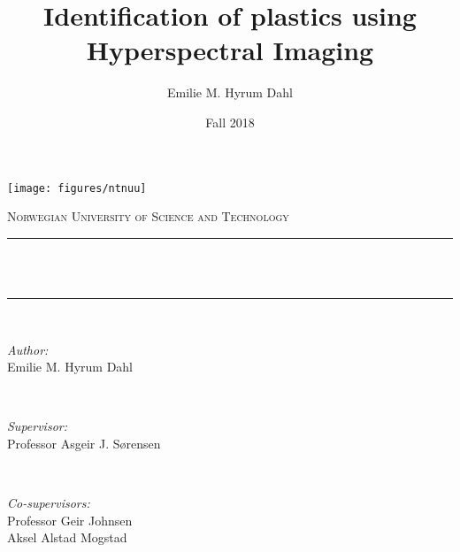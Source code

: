 \documentclass{report}
\title{Identification of plastics using Hyperspectral Imaging}								%
\author{Emilie M. Hyrum Dahl}								%
\date{Fall 2018}											%
\makeatletter
\let\thetitle\@title
\makeatother
\begin{document}
\begin{titlepage}
	\centering
    \vspace*{0.5 cm}
    \texttt{[image: figures/ntnuu]}\\[1.0 cm]	%
    \begin{centering}
    \textsc{\LARGE Norwegian University of \newline\newline Science and Technology}\\[1.0 cm]	%
    \end{centering}
	\rule{\linewidth}{0.3 mm} \\[0.4 cm]
	{ \huge \bfseries \thetitle}\\
	\rule{\linewidth}{0.3 mm} \\[1.3 cm]
	
	\begin{minipage}{0.4\textwidth}
		\begin{flushleft} \large
			\emph{Author:} \\
	    	Emilie M. Hyrum Dahl
			\end{flushleft}
			\end{minipage}~
			\begin{minipage}{0.4\textwidth}
            
			\begin{flushright} \large
	        \emph{Supervisor:}\\
			Professor Asgeir J. S{\o}rensen\\
		\end{flushright}
		\end{minipage}\\[0.5 cm]
		
		
			\begin{minipage}{0.8\textwidth}
			\begin{flushright} \large
			\emph{Co-supervisors:}\\
			Professor Geir Johnsen\\
			Aksel Alstad Mogstad
			\end{flushright}
		
        
	\end{minipage}\\[2 cm]
	
\end{titlepage}


% 
%



\tableofcontents
\end{document}
